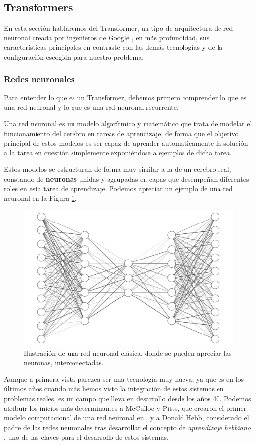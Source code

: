 \subsection{Transformers}
En esta sección hablaremos del Transformer, un tipo de arquitectura de red neuronal creada por ingenieros de Google \cite{TransformerAshish2017}, en más profundidad, sus características principales en contraste con las demás tecnologías y de la configuración escogida para nuestro problema.

\subsubsection{Redes neuronales}
Para entender lo que es un Transformer, debemos primero comprender lo que es una red neuronal y lo que es una red neuronal recurrente.

Una red neuronal es un modelo algorítmico y matemático que trata de modelar el funcionamiento del cerebro en tareas de aprendizaje, de forma que el objetivo principal de estos modelos es ser capaz de aprender automáticamente la solución a la tarea en cuestión simplemente exponiéndose a ejemplos de dicha tarea.

Estos modelos se estructuran de forma muy similar a la de un cerebro real, constando de \textbf{neuronas} unidas y agrupadas en capas que desempeñan diferentes roles en esta tarea de aprendizaje. Podemos apreciar un ejemplo de una red neuronal en la Figura \ref{fig:neural-net}.

\begin{figure}[h]
    \centering
    \includegraphics[width=.7\textwidth]{media/neural-net.pdf}
    \caption{Ilustración de una red neuronal clásica, donde se pueden apreciar las neuronas, interconectadas.}
    \label{fig:neural-net}
\end{figure}

Aunque a primera vista parezca ser una tecnología muy nueva, ya que es en los últimos años cuando más hemos visto la integración de estos sistemas en problemas reales, es un campo que lleva en desarrollo desde los años 40. Podemos atribuir los inicios más determinantes a McCulloc y Pitts, que crearon el primer modelo computacional de una red neuronal en \cite{mcculloch43a}, y a Donald Hebb, considerado el padre de las redes neuronales tras desarrollar el concepto de \textit{aprendizaje hebbiano} \cite{hebb-organization-of-behavior-1949}, uno de las claves para el desarrollo de estos sistemas.

